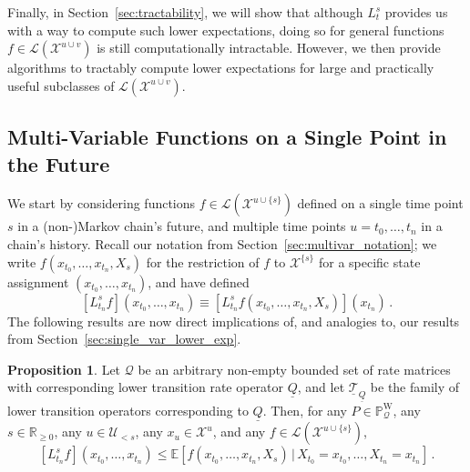 \documentclass[10pt]{paper}
\theoremstyle{definition}
\newtheorem{proposition}[theorem]{Proposition}
\newcommand{\reals}{\mathbb{R}}
\newcommand{\realsnonneg}{\reals_{\geq 0}}
\newcommand{\states}{\mathcal{X}}
\newcommand{\processes}{\mathbb{P}}
\newcommand{\wprocesses}{\processes^{\mathrm{W}}}
\newcommand{\gambles}{\mathcal{L}}
\newcommand{\rateset}{\mathcal{Q}}
\newcommand{\lrate}{\underline{Q}}
\begin{document}
Finally, in Section~\ref{sec:tractability}, we will show that although $L_t^s$ provides us with a way to compute such lower expectations, doing so for general functions $f\in\gambles(\states^{u\cup v})$ is still computationally intractable. However, we then provide algorithms to tractably compute lower expectations for large and practically useful subclasses of $\gambles(\states^{u\cup v})$.

\subsection{Multi-Variable Functions on a Single Point in the Future}\label{sec:function_single_future_multiple_past}

We start by considering functions $f\in\gambles(\states^{u\cup\{s\}})$ defined on a single time point $s$ in a (non-)Markov chain's future, and multiple time points $u=t_0,\ldots,t_n$ in a chain's history. Recall our notation from Section~\ref{sec:multivar_notation}; we write $f(x_{t_0},\ldots,x_{t_n},X_s)$ for the restriction of $f$ to $\states^{\{s\}}$ for a specific state assignment $(x_{t_0},\ldots,x_{t_n})$, and have defined
\begin{equation*}
\left[L_{t_n}^sf\right](x_{t_0},\ldots,x_{t_n}) \equiv \left[L_{t_n}^sf(x_{t_0},\ldots,x_{t_n},X_s)\right](x_{t_n})\,.
\end{equation*}
The following results are now direct implications of, and analogies to, our results from Section~\ref{sec:single_var_lower_exp}.

\begin{proposition}\label{prop:multi_var_single_future_bounded}
Let $\rateset$ be an arbitrary non-empty bounded set of rate matrices with corresponding lower transition rate operator $\lrate$, and let $\underline{\mathcal{T}}_{\lrate}$ be the family of lower transition operators corresponding to $\lrate$. Then, for any $P\in\wprocesses_\rateset$, any $s\in\realsnonneg$, any $u\in\mathcal{U}_{<s}$, any $x_u\in\states^u$, and any $f\in\gambles(\states^{u\cup\{s\}})$,
\begin{equation*}
\left[L_{t_n}^sf\right](x_{t_0},\ldots,x_{t_n}) \leq \mathbb{E}\left[f(x_{t_0},\ldots,x_{t_n},X_s)\,\vert\,X_{t_0}=x_{t_0},\ldots,X_{t_n}=x_{t_n}\right]\,.
\end{equation*}
\end{proposition}
\end{document}
